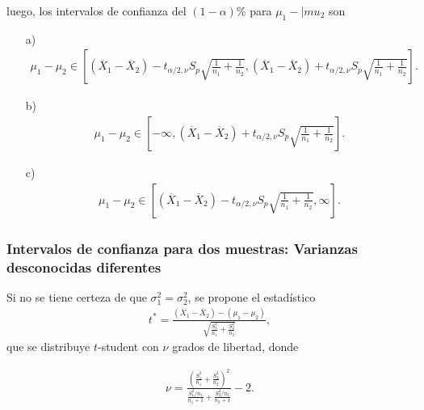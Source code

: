 \documentclass[a4paper]{report} %
\begin{document}
luego, los intervalos de confianza del $\left(1-\alpha\right)\%$ para $\mu_{1}-|mu_{2}$ son 
\begin{itemize}
\item[a) ] \begin{eqnarray}\mu_{1}-\mu_{2}\in\left[\left(\overline{X}_{1}-\overline{X}_{2}\right)- t_{\alpha/2,\nu}S_{p}\sqrt{\frac{1}{n_{1}}+\frac{1}{n_{2}}},\left(\overline{X}_{1}-\overline{X}_{2}\right)+ t_{\alpha/2,\nu}S_{p}\sqrt{\frac{1}{n_{1}}+\frac{1}{n_{2}}}\right].\end{eqnarray}


\item[b) ] \begin{eqnarray}\mu_{1}-\mu_{2}\in\left[-\infty,\left(\overline{X}_{1}-\overline{X}_{2}\right)+ t_{\alpha/2,\nu}S_{p}\sqrt{\frac{1}{n_{1}}+\frac{1}{n_{2}}}\right].\end{eqnarray}

\item[c) ] \begin{eqnarray}\mu_{1}-\mu_{2}\in\left[\left(\overline{X}_{1}-\overline{X}_{2}\right)- t_{\alpha/2,\nu}S_{p}\sqrt{\frac{1}{n_{1}}+\frac{1}{n_{2}}},\infty\right].\end{eqnarray}
\end{itemize}


\subsubsection{Intervalos de confianza para dos muestras: Varianzas desconocidas diferentes}

Si no se tiene certeza de que $\sigma_{1}^{2}=\sigma_{2}^{2}$, se propone el estad\'istico
\begin{eqnarray}
t^{*}=\frac{\left(\overline{X}_{1}-\overline{X}_{2}\right)-\left(\mu_{1}-\mu_{2}\right)}{\sqrt{\frac{S_{1}^{2}}{n_{1}}+\frac{S_{2}^{2}}{n_{2}}}},
\end{eqnarray}
que se distribuye $t$-student con $\nu$ grados de libertad, donde

\begin{eqnarray}
\nu=\frac{\left(\frac{S_{1}^{2}}{n_{1}}+\frac{S_{2}^{2}}{n_{2}}\right)^{2}}{\frac{S_{1}^{2}/n_{1}}{n_{1}+1}+\frac{S_{2}^{2}/n_{2}}{n_{2}+1}}-2.
\end{eqnarray}
\end{document}
